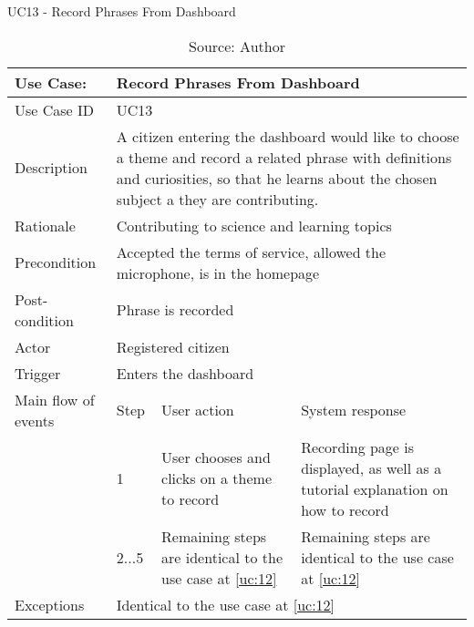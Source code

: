 \begin{table}[ht]
\centering
\caption{UC13 - Record Phrases From Dashboard}
\label{uc:13}
\begin{tabular}{|p{3cm}|p{1cm}|p{5cm}|p{5cm}|}
\hline
Use Case:       & \multicolumn{3}{p{11cm}|}{Record Phrases From Dashboard} \\ \hline
Use Case ID     & \multicolumn{3}{p{11cm}|}{UC13} \\ \hline
Description     & \multicolumn{3}{p{11cm}|}{A citizen entering the dashboard would like to choose a theme and record a related phrase with definitions and curiosities, so that he learns about the chosen subject a they are contributing.} \\ \hline
Rationale       & \multicolumn{3}{p{11cm}|}{Contributing to science and learning topics} \\ \hline
Precondition    & \multicolumn{3}{p{11cm}|}{Accepted the terms of service, allowed the microphone, is in the homepage} \\ \hline
Post-condition  & \multicolumn{3}{p{11cm}|}{Phrase is recorded} \\ \hline
Actor           & \multicolumn{3}{p{11cm}|}{Registered citizen} \\ \hline
Trigger         & \multicolumn{3}{p{11cm}|}{Enters the dashboard} \\ \hline
Main flow of events & Step  & User action & System response \\ \hline
                    & 1     & User chooses and clicks on a theme to record & Recording page is displayed, as well as a tutorial explanation on how to record \\ \hline
                    & 2...5     & Remaining steps are identical to the use case at \ref{uc:12} & Remaining steps are identical to the use case at \ref{uc:12} \\ \hline
Exceptions      & \multicolumn{3}{p{11cm}|}{Identical to the use case at \ref{uc:12}} \\ \hline
\end{tabular}
\caption*{Source: Author}
\end{table}

